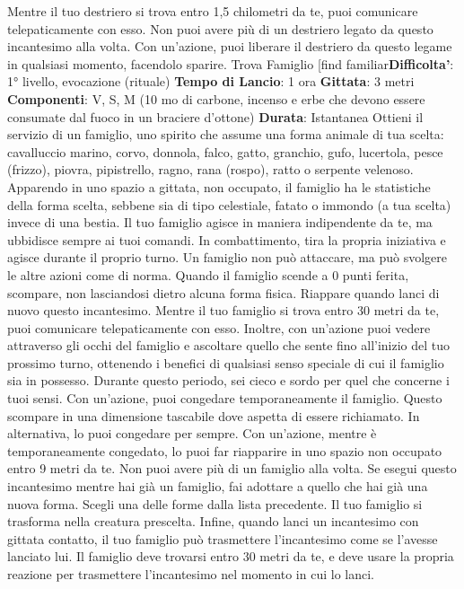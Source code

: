 \begin{multicols}{2}
Mentre il tuo destriero si trova entro 1,5 chilometri da te,
puoi comunicare telepaticamente con esso.
Non puoi avere più di un destriero legato da questo
incantesimo alla volta. Con un’azione, puoi liberare il
destriero da questo legame in qualsiasi momento,
facendolo sparire.
Trova Famiglio
[find familiar\textbf{Difficolta'}:
1° livello, evocazione (rituale)
\textbf{Tempo di Lancio}: 1 ora
\textbf{Gittata}: 3 metri
\textbf{Componenti}: V, S, M (10 mo di carbone, incenso e
erbe che devono essere consumate dal fuoco in un
braciere d’ottone)
\textbf{Durata}: Istantanea
Ottieni il servizio di un famiglio, uno spirito che assume
una forma animale di tua scelta: cavalluccio marino,
corvo, donnola, falco, gatto, granchio, gufo, lucertola,
pesce (frizzo), piovra, pipistrello, ragno, rana (rospo),
ratto o serpente velenoso. Apparendo in uno spazio a
gittata, non occupato, il famiglio ha le statistiche della
forma scelta, sebbene sia di tipo celestiale, fatato o
immondo (a tua scelta) invece di una bestia.
Il tuo famiglio agisce in maniera indipendente da te, ma
ubbidisce sempre ai tuoi comandi. In combattimento,
tira la propria iniziativa e agisce durante il proprio turno.
Un famiglio non può attaccare, ma può svolgere le altre
azioni come di norma.
Quando il famiglio scende a 0 punti ferita, scompare,
non lasciandosi dietro alcuna forma fisica. Riappare
quando lanci di nuovo questo incantesimo.
Mentre il tuo famiglio si trova entro 30 metri da te, puoi
comunicare telepaticamente con esso. Inoltre, con
un’azione puoi vedere attraverso gli occhi del famiglio e
ascoltare quello che sente fino all’inizio del tuo
prossimo turno, ottenendo i benefici di qualsiasi senso
speciale di cui il famiglio sia in possesso. Durante
questo periodo, sei cieco e sordo per quel che
concerne i tuoi sensi.
Con un’azione, puoi congedare temporaneamente il
famiglio. Questo scompare in una dimensione tascabile
dove aspetta di essere richiamato. In alternativa, lo puoi
congedare per sempre. Con un’azione, mentre è
temporaneamente congedato, lo puoi far riapparire in
uno spazio non occupato entro 9 metri da te.
Non puoi avere più di un famiglio alla volta. Se esegui
questo incantesimo mentre hai già un famiglio, fai
adottare a quello che hai già una nuova forma. Scegli
una delle forme dalla lista precedente. Il tuo famiglio si
trasforma nella creatura prescelta.
Infine, quando lanci un incantesimo con gittata contatto,
il tuo famiglio può trasmettere l’incantesimo come se
l’avesse lanciato lui. Il famiglio deve trovarsi entro 30
metri da te, e deve usare la propria reazione per
trasmettere l’incantesimo nel momento in cui lo lanci.

\end{multicols}
